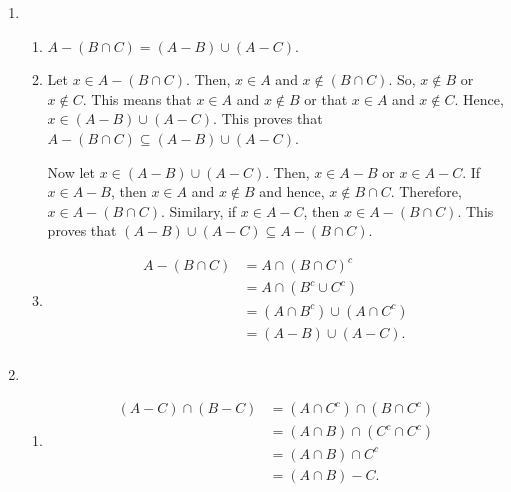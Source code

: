 \begin{enumerate}
\item \begin{enumerate}
\item $A - \left( {B \cap C} \right) = \left( {A - B} \right) \cup \left( {A - C} \right)$.

\item Let $x \in A - \left( {B \cap C} \right)$.  Then, $x \in A$ and 
$x \notin \left( B \cap C \right)$.  So, $x \notin B$ or $x \notin C$.  This means that 
$x \in A$ and $x \notin B$ or that $x \in A$ and $x \notin C$.  Hence, 
$x \in \left( A - B \right) \cup \left( A - C \right)$.  This proves that 
$A - \left( {B \cap C} \right) \subseteq \left( A - B \right) \cup \left( A - C \right)$.

Now let $x \in \left( A - B \right) \cup \left( A - C \right)$.  Then, $x \in A - B$ or 
$x \in A - C$.  If $x \in A - B$, then $x \in A$ and $x \notin B$ and hence, 
$x \notin B \cap C$.  Therefore, $x \in A - \left( B \cap C \right)$.  Similary, if $x \in A - C$, then $x \in A - \left( B \cap C \right)$.  This proves that 
$\left( A - B \right) \cup \left( A - C \right) \subseteq A - \left( B \cap C \right)$.

\item 
\[
\begin{aligned}
A - \left( B \cap C \right) &= A \cap \left( B \cap C \right)^c \\
  &= A \cap \left( B^c \cup C^c \right) \\
  &= \left( A \cap B^c \right) \cup \left( A \cap C^c \right) \\
  &= \left( A - B \right) \cup \left( A - C \right). \\
\end{aligned}
\]
\end{enumerate}


\item \begin{enumerate}
\item \begin{align*}
(A - C) \cap (B - C) &= (A \cap C^c) \cap (B \cap C^c) \\
                     &= (A \cap B) \cap (C^c \cap C^c) \\
                     &= (A \cap B) \cap C^c \\
                     &= (A \cap B) - C.
\end{align*}


\end{enumerate}
\end{enumerate}
